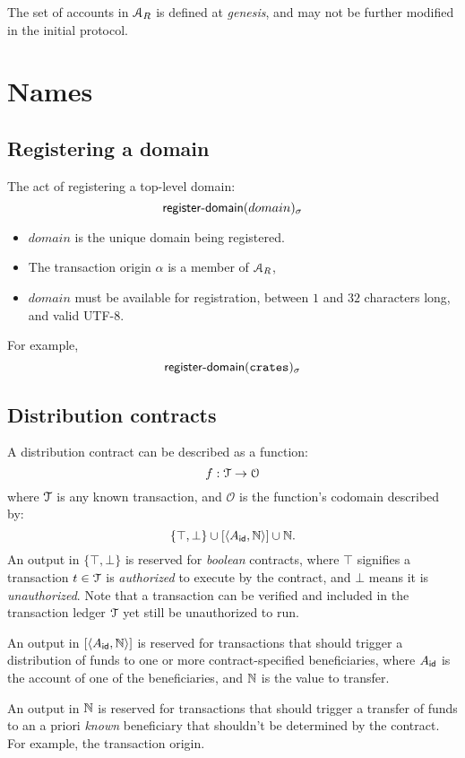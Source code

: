 The set of accounts in $\mathcal{A}_R$ is defined at \emph{genesis}, and may not be
further modified in the initial protocol.

\section{Names}

\subsection{Registering a domain}
The act of registering a top-level domain:
\[
    \operatorname{\mathsf{register-domain}}\lparen domain\rparen_\sigma
\]
\begin{itemize}
    \item $domain$ is the unique domain being registered.
\end{itemize}
\validation
\begin{itemize}
    \item The transaction origin $\alpha$ is a member of $\mathcal{A}_R$,
    \item $domain$ must be available for registration, between $1$ and $32$
        characters long, and valid \textsf{UTF-8}.
\end{itemize}
For example,
\[
    \operatorname{\mathsf{register-domain}}\lparen\mathtt{crates}\rparen_\sigma
\]

\subsection{Distribution contracts}
A distribution contract can be described as a function:
\[
    f : \mathcal{T} \to \mathcal{O}
\]
where $\mathcal{T}$ is any known transaction, and $\mathcal{O}$ is the
function's codomain described by:
\[
    \{\top, \bot\} \cup [\langle A_{\mathsf{id}}, \mathbb{N}\rangle] \cup \mathbb{N}.
\]
An output in $\{\top, \bot\}$ is reserved for \emph{boolean} contracts,
where $\top$ signifies a transaction $t \in \mathcal{T}$ is
\emph{authorized} to execute by the contract, and $\bot$ means it
is \emph{unauthorized}.  Note that a transaction can be verified
and included in the transaction ledger $\mathcal{T}$ yet still be
unauthorized to run.

An output in $[\langle A_{\mathsf{id}}, \mathbb{N}\rangle]$ is reserved for transactions
that should trigger a distribution of funds to one or more
contract-specified beneficiaries, where $A_{\mathsf{id}}$ is the
account of one of the beneficiaries, and $\mathbb{N}$ is the value to
transfer.

An output in $\mathbb{N}$ is reserved for transactions that should
trigger a transfer of funds to an a priori \emph{known} beneficiary
that shouldn't be determined by the contract. For example, the transaction
origin.
